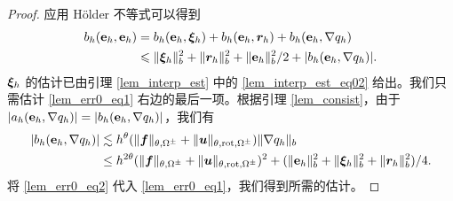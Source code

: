 \begin{proof}
应用 H\"older 不等式可以得到
\begin{equation}
\begin{split}
\label{lem_err0_eq1}
b_h(\mathbf{e}_h,\mathbf{e}_h) & = b_h(\mathbf{e}_h, \boldsymbol{\xi}_h) +  b_h(\mathbf{e}_h, \boldsymbol{r}_h) +  b_h(\mathbf{e}_h, \nabla q_h) \\
& \leqslant \| \boldsymbol{\xi}_h \|^2_b + \| \boldsymbol{r}_h \|^2_b + \| \mathbf{e}_h \|^2_b/2 + |b_h(\mathbf{e}_h, \nabla q_h) |.
\end{split}
\end{equation}
$\boldsymbol{\xi}_h$ 的估计已由引理 \ref{lem_interp_est} 中的 \eqref{lem_interp_est_eq02} 给出。我们只需估计 \eqref{lem_err0_eq1} 右边的最后一项。根据引理 \ref{lem_consist}，由于 $|a_h(\mathbf{e}_h,\nabla q_h)| = |b_h(\mathbf{e}_h,\nabla q_h)|$，我们有
\begin{equation}
\begin{split}
\label{lem_err0_eq2}
|b_h(\mathbf{e}_h, \nabla q_h)| &\lesssim h^{\theta}
(\| \boldsymbol{f} \|_{\theta,\Omega^{\pm}} + \| \boldsymbol{u} \|_{\theta,\mathrm{rot},\Omega^{\pm}})
\| \nabla q_h \|_b \\
& \le  h^{2\theta}  (\| \boldsymbol{f} \|_{\theta,\Omega^{\pm}}+
\| \boldsymbol{u} \|_{\theta,\mathrm{rot},\Omega^{\pm}})^2
+ ( \| \mathbf{e}_h \|^2_b + \| \boldsymbol{\xi}_h \|^2_b + \| \boldsymbol{r}_h \|^2_b)/4.
\end{split}
\end{equation}
将 \eqref{lem_err0_eq2} 代入 \eqref{lem_err0_eq1}，我们得到所需的估计。
\end{proof}

